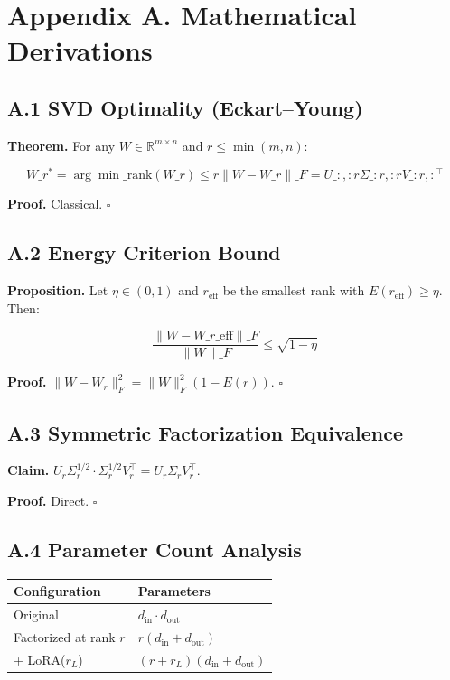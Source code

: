 
\section{Appendix A. Mathematical Derivations}

\subsection{A.1 SVD Optimality (Eckart--Young)}

\textbf{Theorem.} For any $W \in \mathbb{R}^{m \times n}$ and $r \leq \min(m, n)$:

\[
W\_r^* = \arg\min\_{\text{rank}(W\_r) \leq r} \|W - W\_r\|\_F = U\_{:, :r} \Sigma\_{:r, :r} V\_{:r, :}^\top
\tag{A.1}
\]

\textbf{Proof.} Classical. $\square$

\subsection{A.2 Energy Criterion Bound}

\textbf{Proposition.} Let $\eta \in (0, 1)$ and $r_\text{eff}$ be the smallest 
rank with $E(r_\text{eff}) \geq \eta$. Then:

\[
\frac{\|W - W\_{r\_\text{eff}}\|\_F}{\|W\|\_F} \leq \sqrt{1 - \eta}
\tag{A.2}
\]

\textbf{Proof.} $\|W - W_r\|_F^2 = \|W\|_F^2(1 - E(r))$. $\square$

\subsection{A.3 Symmetric Factorization Equivalence}

\textbf{Claim.} $U_r \Sigma_r^{1/2} \cdot \Sigma_r^{1/2} V_r^\top = U_r \Sigma_r V_r^\top$.

\textbf{Proof.} Direct. $\square$

\subsection{A.4 Parameter Count Analysis}

\begin{table}[H]
\centering
\small
\begin{tabular}{ll}
\toprule
\textbf{Configuration} & \textbf{Parameters} \\
\midrule
Original & $d_\text{in} \cdot d_\text{out}$ \\
Factorized at rank $r$ & $r(d_\text{in} + d_\text{out})$ \\
+ LoRA($r_L$) & $(r + r_L)(d_\text{in} + d_\text{out})$ \\
\bottomrule
\end{tabular}
\end{table}

